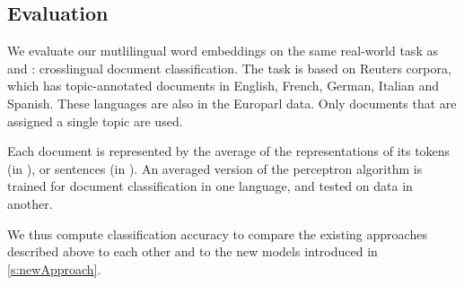 

\subsection{Evaluation}
We evaluate our mutlilingual word embeddings on the same real-world task as \cite{klementiev2012inducing} and \cite{hermann2013multilingual}: crosslingual document classification. The task is based on Reuters corpora, which has topic-annotated documents in English, French, German, Italian and Spanish. These languages are also in the Europarl data. Only documents that are assigned a single topic are used.

Each document is represented by the average of the representations of its tokens (in \cite{klementiev2012inducing}), or sentences (in \cite{hermann2013multilingual}).
An averaged version of the perceptron algorithm is trained for document classification in one language, and tested on data in another.

We thus compute classification accuracy to compare the existing approaches described above to each other and to the new models introduced in \ref{s:newApproach}.






